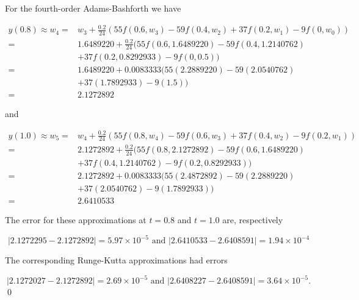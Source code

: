 

\begin{mysolution}
For the fourth-order Adams-Bashforth we have

$$
\begin{aligned}
y(0.8) \approx w_{4}= & w_{3}+\frac{0.2}{24}\left(55 f\left(0.6, w_{3}\right)-59 f\left(0.4, w_{2}\right)+37 f\left(0.2, w_{1}\right)-9 f\left(0, w_{0}\right)\right) \\
= & 1.6489220+\frac{0.2}{24}(55 f(0.6,1.6489220)-59 f(0.4,1.2140762) \\
& +37 f(0.2,0.8292933)-9 f(0,0.5)) \\
= & 1.6489220+0.0083333(55(2.2889220)-59(2.0540762) \\
& +37(1.7892933)-9(1.5)) \\
= & 2.1272892
\end{aligned}
$$

 and

$$
\begin{aligned}
y(1.0) \approx w_{5}= & w_{4}+\frac{0.2}{24}\left(55 f\left(0.8, w_{4}\right)-59 f\left(0.6, w_{3}\right)+37 f\left(0.4, w_{2}\right)-9 f\left(0.2, w_{1}\right)\right) \\
= & 2.1272892+\frac{0.2}{24}(55 f(0.8,2.1272892)-59 f(0.6,1.6489220) \\
& +37 f(0.4,1.2140762)-9 f(0.2,0.8292933)) \\
= & 2.1272892+0.0083333(55(2.4872892)-59(2.2889220) \\
& +37(2.0540762)-9(1.7892933)) \\
= & 2.6410533
\end{aligned}
$$

The error for these approximations at $t=0.8$ and $t=1.0$ are, respectively

$$
|2.1272295-2.1272892|=5.97 \times 10^{-5} \text { and }|2.6410533-2.6408591|=1.94 \times 10^{-4}
$$

The corresponding Runge-Kutta approximations had errors

$$
|2.1272027-2.1272892|=2.69 \times 10^{-5} \text { and }|2.6408227-2.6408591|=3.64 \times 10^{-5} .
$$\qed
\end{mysolution}


